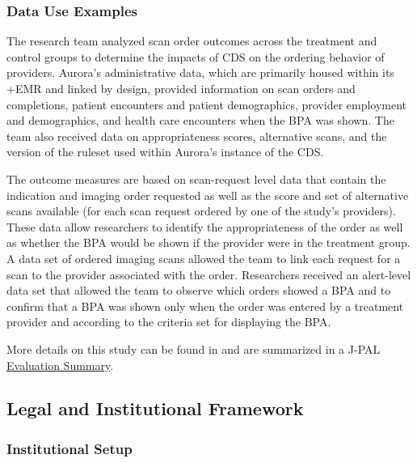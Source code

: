 \documentclass[
]{WileySix}
\begin{document}
\hypertarget{data-use-examples-4}{%
\subsubsection{Data Use Examples}\label{data-use-examples-4}}

The research team analyzed scan order outcomes across the treatment and control groups to determine the impacts of CDS on the ordering behavior of providers. Aurora's administrative data, which are primarily housed within its +EMR\textbar{} and linked by design, provided information on scan orders and completions, patient encounters and patient demographics, provider employment and demographics, and health care encounters when the BPA was shown. The team also received data on appropriateness scores, alternative scans, and the version of the ruleset used within Aurora's instance of the CDS.

The outcome measures are based on scan-request level data that contain the indication and imaging order requested as well as the score and set of alternative scans available (for each scan request ordered by one of the study's providers). These data allow researchers to identify the appropriateness of the order as well as whether the BPA would be shown if the provider were in the treatment group. A data set of ordered imaging scans allowed the team to link each request for a scan to the provider associated with the order. Researchers received an alert-level data set that allowed the team to observe which orders showed a BPA and to confirm that a BPA was shown only when the order was entered by a treatment provider and according to the criteria set for displaying the BPA.

More details on this study can be found in \citep{doyle2019} and are summarized in a J-PAL \href{https://www.povertyactionlab.org/evaluation/clinical-decision-support-radiology-imaging-united-states}{Evaluation Summary}.

\hypertarget{legal-and-institutional-framework-4}{%
\subsection{Legal and Institutional Framework}\label{legal-and-institutional-framework-4}}

\hypertarget{institutional-setup-4}{%
\subsubsection{Institutional Setup}\label{institutional-setup-4}}
\end{document}
